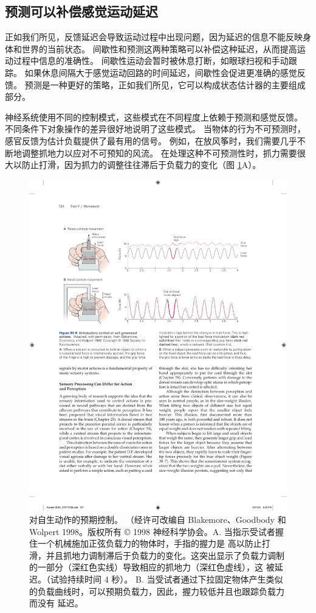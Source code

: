 \subsection{预测可以补偿感觉运动延迟}

正如我们所见，反馈延迟会导致运动过程中出现问题，因为延迟的信息不能反映身体和世界的当前状态。
间歇性和预测这两种策略可以补偿这种延迟，从而提高运动过程中信息的准确性。
间歇性运动会暂时被休息打断，如眼球扫视和手动跟踪。
如果休息间隔大于感觉运动回路的时间延迟，间歇性会促进更准确的感觉反馈。
预测是一种更好的策略，正如我们所见，它可以构成状态估计器的主要组成部分。


神经系统使用不同的控制模式，这些模式在不同程度上依赖于预测和感觉反馈。
不同条件下对象操作的差异很好地说明了这些模式。
当物体的行为不可预测时，感官反馈为估计负载提供了最有用的信号。
例如，在放风筝时，我们需要几乎不断地调整抓地力以应对不可预知的风流。 
在处理这种不可预测性时，抓力需要很大以防止打滑，因为抓力的调整往往滞后于负载力的变化（图 \ref{fig:30_6}A）。


\begin{figure}[htbp]
	\centering
	\includegraphics[width=0.9\linewidth]{chap30/fig_30_6}
	\caption{对自生动作的预期控制。 （经许可改编自 Blakemore、Goodbody 和 Wolpert 1998。版权所有 © 1998 神经科学协会。A. 当指示受试者握住一个机械施加正弦负载力的物体时，手指的握力是 高以防止打滑，并且抓地力调制滞后于负载力的变化。这突出显示了负载力调制的一部分（深红色实线）导致相应的抓地力（深红色虚线），这 被延迟。（试验持续时间 4 秒）。 B. 当受试者通过下拉固定物体产生类似的负载曲线时，可以预期负载力，因此，握力较低并且也跟踪负载力而没有 延迟。}
	\label{fig:30_6}
\end{figure}


